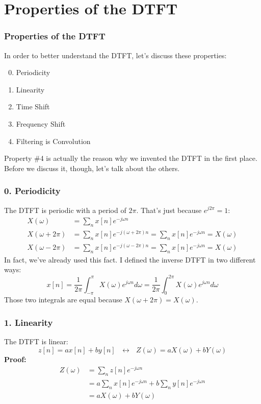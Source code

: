 \documentclass{beamer}
\begin{document}
\section[DTFT Properties]{Properties of the DTFT}
\setcounter{subsection}{1}

\begin{frame}
  \frametitle{Properties of the DTFT}

  In order to better understand the DTFT, let's discuss these properties:
  \begin{enumerate}
    \setcounter{enumi}{-1}
  \item Periodicity
  \item Linearity
  \item Time Shift
  \item Frequency Shift
  \item Filtering is Convolution
  \end{enumerate}
  Property \#4 is actually the reason why we invented the DTFT in the first place.
  Before we discuss it, though, let's talk about the others.
\end{frame}

\begin{frame}
  \frametitle{0. Periodicity}

  The DTFT is periodic with a  period of $2\pi$.  That's just because  $e^{j2\pi}=1$:
  \begin{align*}
    X(\omega) &= \sum_n x[n]e^{-j\omega n}\\
    X(\omega+2\pi) &= \sum_n x[n]e^{-j(\omega+2\pi) n} = \sum_n x[n]e^{-j\omega n} = X(\omega)\\
    X(\omega-2\pi) &= \sum_n x[n]e^{-j(\omega-2\pi) n} = \sum_n x[n]e^{-j\omega n} = X(\omega)
  \end{align*}
  In fact, we've already used this fact.  I defined the inverse DTFT
  in two different ways:
  \[
  x[n]=\frac{1}{2\pi}\int_{-\pi}^\pi X(\omega)e^{j\omega n}d\omega =
  \frac{1}{2\pi}\int_{0}^{2\pi} X(\omega)e^{j\omega n}d\omega
  \]
  Those two integrals are equal because $X(\omega+2\pi)=X(\omega)$.
\end{frame}

\begin{frame}
  \frametitle{1. Linearity}

  The DTFT is linear:
  \[
  z[n] = ax[n]+by[n]~~~\leftrightarrow~~~
  Z(\omega)=aX(\omega)+bY(\omega)
  \]
  {\bf Proof:}
  \begin{align*}
    Z(\omega) &= \sum_n z[n]e^{-j\omega n}\\
    &= a\sum_n x[n]e^{-j\omega n} + b\sum_n y[n]e^{-j\omega n}\\
    &= aX(\omega) + bY(\omega)
  \end{align*}
\end{frame}
\end{document}

